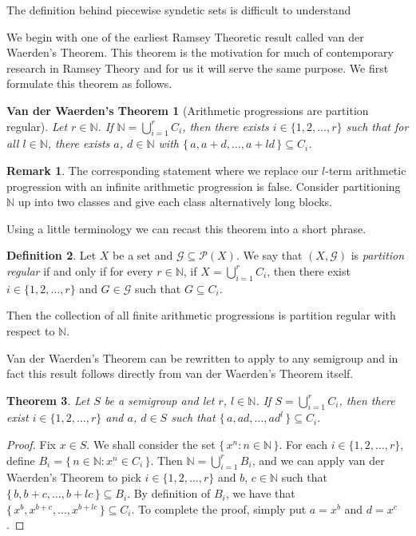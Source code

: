 \documentclass[12pt]{article}
\theoremstyle{plain}
\newtheorem{thm}{Theorem}[section]
\newtheorem*{vdw}{Van der Waerden's Theorem}
\theoremstyle{definition}
\newtheorem{defn}[thm]{Definition}
\newtheorem{rmk}[thm]{Remark}
\newcommand{\bbN}{\mathbb{N}}
\newcommand{\calG}{\mathcal{G}}
\newcommand{\calP}{\mathcal{P}}
\begin{document}
The definition behind piecewise syndetic sets is difficult to
understand 

We begin with one of the earliest Ramsey Theoretic result called van
der Waerden's Theorem.  
This theorem is the motivation for much of contemporary research
in Ramsey Theory and for us it will serve the same purpose.
We first formulate this theorem as follows. 

\begin{vdw}[Arithmetic progressions are partition regular]
  Let $r \in \bbN$.
  If $\bbN = \bigcup_{i=1}^r C_i$, then there exists $i \in \{1, 2,
  \ldots, r\}$ such that for all $l \in \bbN$, there exists $a$, $d
  \in \bbN$ with $\{\, a, a+d, \ldots, a+ld \,\} \subseteq C_i$.
\end{vdw}

\begin{rmk}
  The corresponding statement where we replace our \mbox{$l$-term}
  arithmetic progression with an infinite arithmetic progression is
  false.
  Consider partitioning $\bbN$ up into two classes and give each class
  alternatively long blocks. 
\end{rmk}

Using a little terminology we can recast this theorem into a short
phrase. 

\begin{defn}
  Let $X$ be a set and $\calG \subseteq \calP(X)$.
  We say that $(X, \calG)$ is \textsl{partition regular} if and only
  if for every $r \in \bbN$, if $X = \bigcup_{i=1}^r C_i$, then there
  exist $i \in \{1, 2, \ldots, r\}$ and $G \in \calG$ such that $G
  \subseteq C_i$.
\end{defn}

Then the collection of all finite arithmetic progressions is partition
regular with respect to $\bbN$. 

Van der Waerden's Theorem can be rewritten to apply to any semigroup
and in fact this result follows directly from van der Waerden's
Theorem itself.

\begin{thm}
  Let $S$ be a semigroup and let $r$, $l \in \bbN$.
  If $S = \bigcup_{i=1}^r C_i$, then there exist $i \in \{1, 2,
  \ldots, r\}$ and $a$, $d \in S$ such that $\{\, a , ad, \ldots, ad^l
  \,\} \subseteq C_i$. 
\end{thm}
\begin{proof}
  Fix $x \in S$.
  We shall consider the set $\{\, x^n : n \in \bbN \,\}$.
  For each $i \in \{1, 2, \ldots, r\}$, define $B_i = \{\, n \in \bbN
  : x^n \in C_i \,\}$.
  Then $\bbN = \bigcup_{i=1}^r B_i$, and we can apply van der
  Waerden's Theorem to pick $i \in \{1, 2, \ldots, r\}$ and $b$, $c
  \in \bbN$ such that $\{\, b, b+c, \ldots, b+lc \,\} \subseteq B_i$. 
  By definition of $B_i$, we have that $\{\, x^b, x^{b+c}, \ldots,
  x^{b+lc} \,\} \subseteq C_i$. 
  To complete the proof, simply put $a = x^b$ and $d = x^c$. 
\end{proof}
\end{document}
